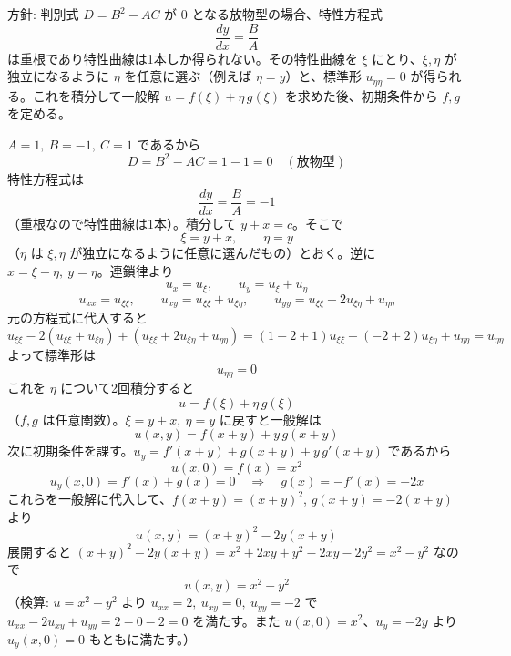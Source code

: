 
方針: 判別式 $D=B^2-AC$ が $0$ となる放物型の場合、特性方程式
\[
\frac{dy}{dx} = \frac{B}{A}
\]
は重根であり特性曲線は1本しか得られない。その特性曲線を $\xi$ にとり、$\xi,\eta$ が独立になるように $\eta$ を任意に選ぶ（例えば $\eta=y$）と、標準形 $u_{\eta\eta}=0$ が得られる。これを積分して一般解 $u=f(\xi)+\eta\,g(\xi)$ を求めた後、初期条件から $f,g$ を定める。

$A=1,\ B=-1,\ C=1$ であるから
\[
D = B^{2}-AC = 1-1 = 0 \quad (\text{放物型})
\]
特性方程式は
\[
\frac{dy}{dx} = \frac{B}{A} = -1
\]
（重根なので特性曲線は1本）。積分して $y+x=c$。そこで
\[
\xi = y+x, \qquad \eta = y
\]
（$\eta$ は $\xi,\eta$ が独立になるように任意に選んだもの）とおく。逆に $x=\xi-\eta,\ y=\eta$。連鎖律より
\[
u_x = u_\xi, \qquad u_y = u_\xi + u_\eta
\]
\[
u_{xx}=u_{\xi\xi}, \qquad u_{xy}=u_{\xi\xi}+u_{\xi\eta}, \qquad u_{yy}=u_{\xi\xi}+2u_{\xi\eta}+u_{\eta\eta}
\]
元の方程式に代入すると
\[
u_{\xi\xi} - 2(u_{\xi\xi}+u_{\xi\eta}) + (u_{\xi\xi}+2u_{\xi\eta}+u_{\eta\eta})
= (1-2+1)u_{\xi\xi} + (-2+2)u_{\xi\eta} + u_{\eta\eta} = u_{\eta\eta}
\]
よって標準形は
\[
u_{\eta\eta} = 0
\]
これを $\eta$ について2回積分すると
\[
u = f(\xi) + \eta\,g(\xi)
\]
（$f,g$ は任意関数）。$\xi=y+x,\ \eta=y$ に戻すと一般解は
\[
u(x,y) = f(x+y) + y\,g(x+y)
\]
次に初期条件を課す。$u_y = f'(x+y) + g(x+y) + y\,g'(x+y)$ であるから
\[
u(x,0) = f(x) = x^{2}
\]
\[
u_y(x,0) = f'(x) + g(x) = 0 \quad\Longrightarrow\quad g(x) = -f'(x) = -2x
\]
これらを一般解に代入して、$f(x+y)=(x+y)^2$, $g(x+y)=-2(x+y)$ より
\[
u(x,y) = (x+y)^{2} - 2y(x+y)
\]
展開すると $(x+y)^2 - 2y(x+y) = x^2+2xy+y^2-2xy-2y^2 = x^2 - y^2$ なので
\[
\boxed{\; u(x,y) = x^{2} - y^{2} \;}
\]
（検算: $u=x^2-y^2$ より $u_{xx}=2,\ u_{xy}=0,\ u_{yy}=-2$ で $u_{xx}-2u_{xy}+u_{yy}=2-0-2=0$ を満たす。また $u(x,0)=x^2$、$u_y=-2y$ より $u_y(x,0)=0$ もともに満たす。）
